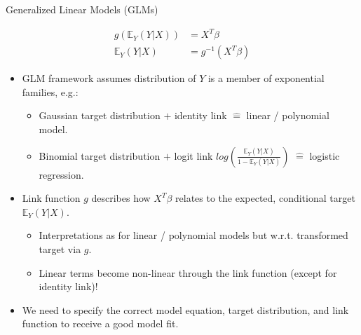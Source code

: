 \documentclass[10pt,compress,t,notes=noshow, xcolor=table]{beamer}
\begin{document}
\begin{frame}{Generalized Linear Models (GLMs)}

\begin{align*}
g\left(\mathbb{E}_Y(Y \vert X)\right) &= X^T\beta \\
\mathbb{E}_Y \left(Y \vert X\right) &= g^{-1}(X^T\beta)
\end{align*}
\begin{itemize}[<+->]
\item GLM framework assumes distribution of $Y$ is a member of exponential families, e.g.: %
\begin{itemize}[<.->]
    \item Gaussian target distribution $+$ identity link $\hat =$ linear / polynomial model.
    \item Binomial target distribution $+$ logit link $log\left(\frac{\mathbb{E}_Y(Y \vert X)}{1 - \mathbb{E}_Y(Y \vert X)}\right)$ $\hat =$ logistic regression.
\end{itemize}
\item Link function $g$ describes how $X^T\beta$ relates to the expected, conditional target $\mathbb{E}_Y(Y \vert X)$.
\begin{itemize}[<.->]
    \item Interpretations as for linear / polynomial models but w.r.t. transformed target via $g$.
    \item Linear terms become non-linear through the link function (except for identity link)!
\end{itemize}
\item We need to specify the correct model equation, target distribution, and link function to receive a good model fit.
\end{itemize}
\end{frame}
\end{document}
